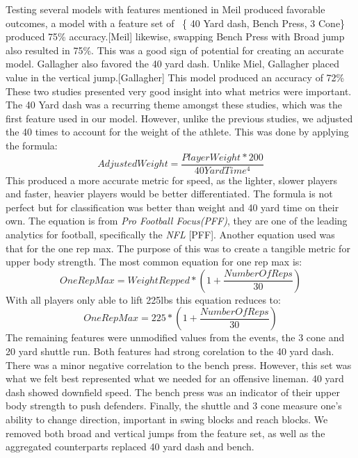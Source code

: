 \documentclass[confrence]{IEEEtran}
\begin{document}
Testing several models with features mentioned in Meil produced favorable outcomes, a model with a feature set of  \{
40 Yard dash, Bench Press, 3 Cone\} produced 75\% accuracy.[Meil] likewise, swapping Bench Press with Broad jump also resulted in 75\%.
This was a good sign of potential for creating an accurate model.
Gallagher also favored the 40 yard dash. Unlike Miel, Gallagher placed value in the vertical jump.[Gallagher] This model produced an accuracy of 72\%
These two studies presented very good insight into what metrics were important.
The 40 Yard dash was a recurring theme amongst these studies, which was the first feature used in our model.
However, unlike the previous studies, we adjusted the 40 times to account for the weight of the athlete. This was done by applying the formula:
\[
    AdjustedWeight = \frac{PlayerWeight*200}{40YardTime^4}
\]
This produced a more accurate metric for speed, as the lighter, slower players and faster, heavier players would be better differentiated.
The formula is not perfect but for classification was better than weight and 40 yard time on their own.
The equation is from \textit{Pro Football Focus(PFF)}, they are one of the leading analytics for football, specifically the \textit{NFL} [PFF].
Another equation used was that for the one rep max. The purpose of this was to create a tangible metric for upper body strength.
The most common equation for one rep max is:
\[
    OneRepMax = WeightRepped*(1+\frac{NumberOfReps}{30})
\]
With all players only able to lift 225lbs this equation reduces to:
\[
    OneRepMax = 225*(1+\frac{NumberOfReps}{30})
\]
The remaining features were unmodified values from the events, the 3 cone and 20 yard shuttle run.
Both features had strong corelation to the 40 yard dash. There was a minor negative correlation to the bench press.
However, this set was what we felt best represented what we needed for an offensive lineman.
40 yard dash showed downfield speed. The bench press was an indicator of their upper body strength to push defenders. Finally, the shuttle and 3 cone measure one's ability to change direction, important in swing blocks and reach blocks.
We removed both broad and vertical jumps from the feature set, as well as the aggregated counterparts replaced 40 yard dash and bench.
\end{document}
